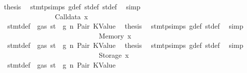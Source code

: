 \begin{isabellebody}
\ {\isacharquery}{\kern0pt}thesis\ \isamarkupfalse%
\ stmt{\isachardot}{\kern0pt}psimps{\isacharparenleft}{\kern0pt}{}{\isacharparenright}{\kern0pt}\ g{\isacharunderscore}{\kern0pt}def\ st{\isacharprime}{\kern0pt}{\isacharunderscore}{\kern0pt}def\ st{\isacharprime}{\kern0pt}{\isacharprime}{\kern0pt}{\isacharunderscore}{\kern0pt}def\ \isamarkupfalse%
\ simp\isanewline
\ \ \ \ \ \ \ \ \ \ \ \ \ \ \isamarkupfalse%
\isanewline
\ \ \ \ \ \ \ \ \ \ \ \ \isamarkupfalse%
\isanewline
\ \ \ \ \ \ \ \ \ \ \ \ \ \ \isamarkupfalse%
\ {\isacharparenleft}{\kern0pt}Calldata\ x{}{\isacharparenright}{\kern0pt}\isanewline
\ \ \ \ \ \ \ \ \ \ \ \ \ \ \isamarkupfalse%
\ {}{\isacharparenleft}{\kern0pt}{}{\isacharparenright}{\kern0pt}\ stmt{\isacharunderscore}{\kern0pt}def\ {\isacharbackquoteopen}{\isasymnot}\ gas\ st\ {\isasymle}\ g{\isacharbackquoteclose}\ n\ Pair\ KValue\ \isamarkupfalse%
\ {\isacharquery}{\kern0pt}thesis\ \isamarkupfalse%
\ stmt{\isachardot}{\kern0pt}psimps{\isacharparenleft}{\kern0pt}{}{\isacharparenright}{\kern0pt}\ g{\isacharunderscore}{\kern0pt}def\ st{\isacharprime}{\kern0pt}{\isacharunderscore}{\kern0pt}def\ \isamarkupfalse%
\ simp\isanewline
\ \ \ \ \ \ \ \ \ \ \ \ \isamarkupfalse%
\isanewline
\ \ \ \ \ \ \ \ \ \ \ \ \ \ \isamarkupfalse%
\ {\isacharparenleft}{\kern0pt}Memory\ x{}{\isacharparenright}{\kern0pt}\isanewline
\ \ \ \ \ \ \ \ \ \ \ \ \ \ \isamarkupfalse%
\ {}{\isacharparenleft}{\kern0pt}{}{\isacharparenright}{\kern0pt}\ stmt{\isacharunderscore}{\kern0pt}def\ {\isacharbackquoteopen}{\isasymnot}\ gas\ st\ {\isasymle}\ g{\isacharbackquoteclose}\ n\ Pair\ KValue\ \isamarkupfalse%
\ {\isacharquery}{\kern0pt}thesis\ \isamarkupfalse%
\ stmt{\isachardot}{\kern0pt}psimps{\isacharparenleft}{\kern0pt}{}{\isacharparenright}{\kern0pt}\ g{\isacharunderscore}{\kern0pt}def\ st{\isacharprime}{\kern0pt}{\isacharunderscore}{\kern0pt}def\ \isamarkupfalse%
\ simp\isanewline
\ \ \ \ \ \ \ \ \ \ \ \ \isamarkupfalse%
\isanewline
\ \ \ \ \ \ \ \ \ \ \ \ \ \ \isamarkupfalse%
\ {\isacharparenleft}{\kern0pt}Storage\ x{}{\isacharparenright}{\kern0pt}\isanewline
\ \ \ \ \ \ \ \ \ \ \ \ \ \ \isamarkupfalse%
\ {}{\isacharparenleft}{\kern0pt}{}{\isacharparenright}{\kern0pt}\ stmt{\isacharunderscore}{\kern0pt}def\ {\isacharbackquoteopen}{\isasymnot}\ gas\ st\ {\isasymle}\ g{\isacharbackquoteclose}\ n\ Pair\ KValue\ \isamarkupfalse%

\end{isabellebody}
